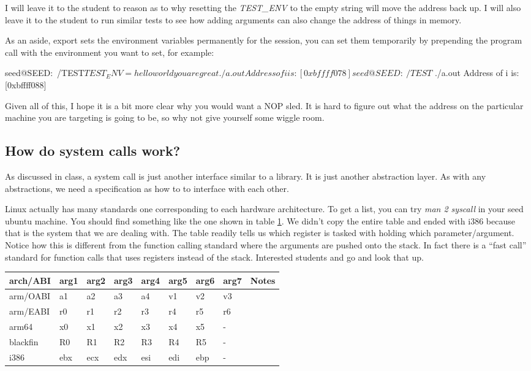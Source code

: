 I will leave it to the student to reason as to why resetting the {\em TEST\_ENV} to the empty string will move the address back up. I will also leave it to the student to run similar tests to see how adding arguments can also change the address of things in memory.


As an aside, export sets the environment variables permanently for the session, you can set them temporarily by prepending the program call with the environment you want to set, for example:

\begin{code}
seed@SEED:~/TEST$ TEST_ENV=helloworldyouaregreat ./a.out 
Address of i is: [0xbffff078]
seed@SEED:~/TEST$ ./a.out 
Address of i is: [0xbffff088]
\end{code}

Given all of this, I hope it is a bit more clear why you would want a NOP sled. It is hard to figure out what the address on the particular machine you are targeting is going to be, so why not give yourself some wiggle room. 

\subsection{How do system calls work?}

As discussed in class, a system call is just another interface similar to a library. It is just another abstraction layer. As with any abstractions, we need a specification as how to to interface with each other. 

Linux actually has many standards one corresponding to each hardware architecture. To get a list, you can try {\em man 2 syscall} in your seed ubuntu machine. You should find something like the one shown in table \ref{table:man_syscall}. We didn't copy the entire table and ended with i386 because that is the system that we are dealing with. The table readily tells us which register is tasked with holding which parameter/argument. Notice how this is different from the function calling standard where the arguments are pushed onto the stack. In fact there is a ``fast call'' standard for function calls that uses registers instead of the stack. Interested students and go and look that up.

\begin{table}
\begin{tabular}{l l l l l l l l l} \\ 
       arch/ABI     & arg1 & arg2 & arg3 & arg4 & arg5 & arg6 & arg7 & Notes \\ \hline
       arm/OABI     & a1   & a2   & a3   & a4   & v1   & v2   & v3 \\
       arm/EABI     & r0   & r1   & r2   & r3   & r4   & r5   & r6 \\
       arm64        & x0   & x1   & x2   & x3   & x4   & x5   & - \\
       blackfin     & R0   & R1   & R2   & R3   & R4   & R5   & - \\
       i386         & ebx  & ecx  & edx  & esi  & edi  & ebp  & - \\
\end{tabular}
\label{table:man_syscall}
\end{table}


